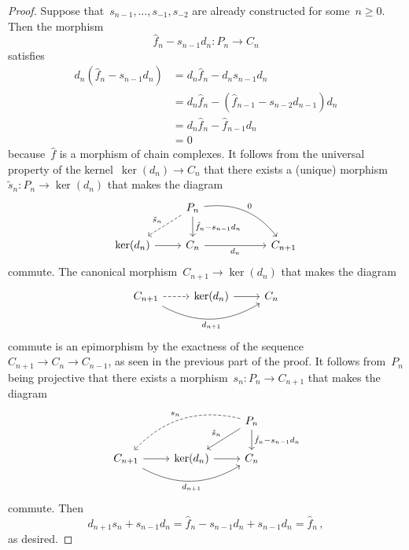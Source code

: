 \begin{proof}
  Suppose that~$s_{n-1}, \dotsc, s_{-1}, s_{-2}$ are already constructed for some~$n \geq 0$.
  Then the morphism
  \[
    \hat{f}_n - s_{n-1} d_n
    \colon
    P_n
    \to
    C_n
  \]
  satisfies
  \begin{align*}
        d_n ( \hat{f}_n - s_{n-1} d_n)
    &=  d_n \hat{f}_n - d_n s_{n-1} d_n \\
    &= d_n \hat{f}_n - ( \hat{f}_{n-1} - s_{n-2} d_{n-1} ) d_n  \\
    &= d_n \hat{f}_n - \hat{f}_{n-1} d_n  \\
    &= 0
  \end{align*}
  because~$\hat{f}$ is a morphism of chain complexes.
  It follows from the universal property of the kernel~$\ker(d_n) \to C_n$ that there exists a (unique) morphism~$\tilde{s}_n \colon P_n \to \ker(d_n)$ that makes the diagram
  \[
    \begin{tikzcd}
        {}
      & P_n
        \arrow[bend left]{drr}[above right]{0}
        \arrow{d}[right]{\hat{f}_n - s_{n-1} d_n}
        \arrow[dashed]{dl}[above left]{\tilde{s}_n}
      & {}
      \\
        \ker(d_n)
        \arrow{r}
      & C_n
        \arrow{rr}[below]{d_n}
      & {}
      & C_{n+1}
    \end{tikzcd}
  \]
  commute.
  The canonical morphism~$C_{n+1} \to \ker(d_n)$ that makes the diagram
  \[
    \begin{tikzcd}
        C_{n+1}
        \arrow[dashed]{r}
        \arrow[bend right]{rr}[below]{d_{n+1}}
      & \ker(d_n)
        \arrow{r}
      & C_n
    \end{tikzcd}
  \]
  commute is an epimorphism by the exactness of the sequence~$C_{n+1} \to C_n \to C_{n-1}$, as seen in the previous part of the proof.
  It follows from~$P_n$ being projective that there exists a morphism~$s_n \colon P_n \to C_{n+1}$ that makes the diagram
  \[
    \begin{tikzcd}
        {}
      & {}
      & P_n
        \arrow{d}[right]{\hat{f}_n - s_{n-1} d_n}
        \arrow{dl}[above left]{\tilde{s}_n}
        \arrow[dashed, bend right]{dll}[above left]{s_n}
      \\
        C_{n+1}
        \arrow{r}
        \arrow[bend right]{rr}[below]{d_{n+1}}
      & \ker(d_n)
        \arrow{r}
      & C_n
    \end{tikzcd}
  \]
  commute.
  Then
  \[
      d_{n+1} s_n + s_{n-1} d_n
    = \hat{f}_n - s_{n-1} d_n + s_{n-1} d_n
    = \hat{f}_n \,,
  \]
  as desired.
\end{proof}


